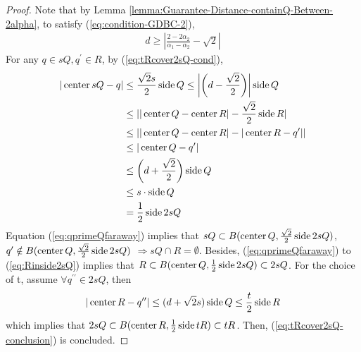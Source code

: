 \begin{proof}
    Note that by Lemma \ref{lemma:Guarantee-Distance-containQ-Between-2alpha}, to satisfy (\ref{eq:condition-GDBC-2}),   
    \begin{equation*}
        \begin{split}
            d \geq \left|\frac{2 - 2\alpha_2}{\alpha_1-\alpha_2}-\sqrt{2}\right|
        \end{split}
    \end{equation*}
    For any $q\in sQ, q^\prime\in R$, by (\ref{eq:tRcover2sQ-cond}), 
    \begin{subequations}
        \label{s}
        \begin{align}
            |\operatorname{center} sQ - q| &\leq \frac{\sqrt{2}s}{2}\operatorname{side} Q \leq \left|\left( d-\frac{\sqrt{2}}{2}\right )\right|\operatorname{side} Q  \notag \\
            &\leq ||\operatorname{center} Q-\operatorname{center} R|-\frac{\sqrt{2}}{2}\operatorname{side} R| \notag \\
            &\leq ||\operatorname{center} Q-\operatorname{center} R| - |\operatorname{center} R - q^\prime|| \notag \\
            &\leq |\operatorname{center} Q-q^\prime| \label{eq:qprimeQfaraway} \\ 
            &\leq \left (d + \frac{\sqrt{2}}{2}\right)\operatorname{side} Q \notag \\
            &\leq s\cdot \operatorname{side} Q \notag \\
            &= \frac{1}{2}\operatorname{side} 2sQ\label{eq:Rinside2sQ}
        \end{align}
    \end{subequations}
    Equation (\ref{eq:qprimeQfaraway}) implies that $sQ\subset B(\operatorname{center} Q, \frac{\sqrt{2}}{2}\operatorname{side} 2sQ)$, $q^\prime \notin B(\operatorname{center} Q, \frac{\sqrt{2}}{2}\operatorname{side} 2sQ)$ $\Rightarrow sQ\cap R = \emptyset$. Besides, (\ref{eq:qprimeQfaraway}) to (\ref{eq:Rinside2sQ}) implies that $R\subset B(\operatorname{center} Q, \frac{1}{2}\operatorname{side} 2sQ)\subset 2sQ$. For the choice of t, assume $\forall q^{\prime\prime}\in 2sQ$, then
    \begin{equation*}
        |\operatorname{center} R - q^{\prime\prime}|\leq (d+\sqrt{2}s)\operatorname{side} Q \leq \frac{t}{2}\operatorname{side} R
    \end{equation*}
    which implies that $2sQ \subset B(\operatorname{center} R, \frac{1}{2}\operatorname{side} tR)\subset tR$. Then, (\ref{eq:tRcover2sQ-conclusion}) is concluded. 
\end{proof}


